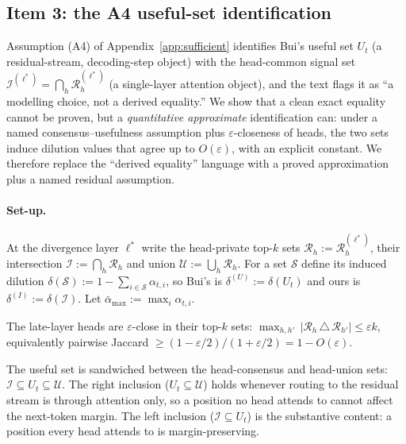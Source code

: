 \subsection{Item 3: the A4 useful-set identification}
\label{app:a4}

Assumption (A4) of Appendix~\ref{app:sufficient} identifies Bui's useful set
$U_t$ (a residual-stream, decoding-step object) with the head-common signal
set $\mathcal{I}^{(\ell^*)}=\bigcap_h\mathcal{R}^{(\ell^*)}_h$ (a single-layer
attention object), and the text flags it as ``a modelling choice, not a derived
equality.'' We show that a clean exact equality cannot be proven, but a
\emph{quantitative approximate} identification can: under a named
consensus--usefulness assumption plus $\varepsilon$-closeness of heads, the two
sets induce dilution values that agree up to $O(\varepsilon)$, with an explicit
constant. We therefore replace the ``derived equality'' language with a proved
approximation plus a named residual assumption.

\paragraph{Set-up.} At the divergence layer $\ell^*$ write the head-private
top-$k$ sets $\mathcal{R}_h:=\mathcal{R}^{(\ell^*)}_h$, their intersection
$\mathcal{I}:=\bigcap_h\mathcal{R}_h$ and union
$\mathcal{U}:=\bigcup_h\mathcal{R}_h$. For a set $\mathcal{S}$ define its
induced dilution $\delta(\mathcal{S}):=1-\sum_{i\in\mathcal{S}}\alpha_{t,i}$, so
Bui's is $\delta^{(U)}:=\delta(U_t)$ and ours is
$\delta^{(I)}:=\delta(\mathcal{I})$. Let $\bar\alpha_{\max}:=\max_i\alpha_{t,i}$.

\begin{assumption}
\label{ass:eps-close}
The late-layer heads are $\varepsilon$-close in their top-$k$ sets:
$\max_{h,h'}\,|\mathcal{R}_h\,\triangle\,\mathcal{R}_{h'}|\le\varepsilon k$,
equivalently pairwise Jaccard $\ge (1-\varepsilon/2)/(1+\varepsilon/2)=1-O(\varepsilon)$.
\end{assumption}

\begin{assumption}
\label{ass:cua}
The useful set is sandwiched between the head-consensus and head-union sets:
$\mathcal{I}\subseteq U_t\subseteq\mathcal{U}$. The right inclusion
($U_t\subseteq\mathcal{U}$) holds whenever routing to the residual stream is
through attention only, so a position no head attends to cannot affect the
next-token margin. The left inclusion ($\mathcal{I}\subseteq U_t$) is the
substantive content: a position every head attends to is margin-preserving.
\end{assumption}

